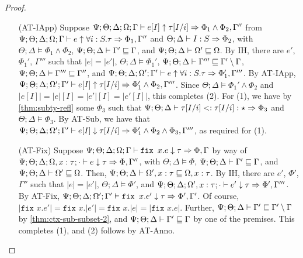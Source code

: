 \begin{proof}
\begin{itemize}
  \item[(AT-IApp)] Suppose $\Psi ; \Theta ; \Delta ; \Omega ; \Gamma \vdash e [I] \uparrow \tau[I/i] \Rightarrow \Phi_1 \wedge \Phi_2,\Gamma''$
  from $\Psi ; \Theta ; \Delta ; \Omega ; \Gamma \vdash e \uparrow \forall i : S.\tau \Rightarrow \Phi_1,\Gamma''$ and
  $\Theta ; \Delta \vdash I : S \Rightarrow \Phi_2$, with
  $\Theta ; \Delta \vDash \Phi_1 \wedge \Phi_2$,
  $\Psi ; \Theta ; \Delta \vdash \Gamma' \sqsubseteq \Gamma$, and
  $\Psi ; \Theta ; \Delta \vdash \Omega' \sqsubseteq \Omega$.
  By IH, there are $e'$, $\Phi_1'$, $\Gamma'''$ such that
  $|e| = |e'|$,
  $\Theta ; \Delta \vDash \Phi_1'$,
  $\Psi ; \Theta ; \Delta \vdash \Gamma''' \sqsubseteq \Gamma' \setminus \Gamma$,
  $\Psi ; \Theta ; \Delta \vdash \Gamma''' \sqsubseteq \Gamma''$, and
  $\Psi ; \Theta ; \Delta ; \Omega' ; \Gamma' \vdash e \uparrow \forall i : S. \tau \Rightarrow \Phi_1',\Gamma'''$.
  By AT-IApp,
  $\Psi ; \Theta ; \Delta ; \Omega' ; \Gamma' \vdash e [I] \uparrow \tau[I/i] \Rightarrow \Phi_1' \wedge \Phi_2,\Gamma'''$.
  Since $\Theta ; \Delta \vDash \Phi_1' \wedge \Phi_2$ and $|e[I]| = |e|[I] = |e'|[I] = |e'[I]|$, this completes (2).
  For (1), we have by \autoref{thm:subty-refl} some $\Phi_3$ such that $\Psi ; \Theta ; \Delta \vdash \tau[I/i] <: \tau[I/i] : \star \Rightarrow \Phi_3$
  and $\Theta ; \Delta \vDash \Phi_3$.
  By AT-Sub, we  have that $\Psi ; \Theta ; \Delta ; \Omega' ; \Gamma' \vdash e [I] \downarrow \tau[I/i] \Rightarrow \Phi_1' \wedge \Phi_2 \wedge \Phi_3,\Gamma'''$,
  as required for (1).
  
  \item[(AT-Fix)] Suppose $\Psi ; \Theta ; \Delta ; \Omega ; \Gamma \vdash \texttt{fix } x.e \downarrow \tau \Rightarrow \Phi,\Gamma$
  by way of $\Psi ; \Theta ; \Delta ; \Omega, x : \tau ; \cdot \vdash e \downarrow \tau \Rightarrow \Phi,\Gamma''$, with
  $\Theta ; \Delta \vDash \Phi$,
  $\Psi ; \Theta ; \Delta \vdash \Gamma' \sqsubseteq \Gamma$, and
  $\Psi ; \Theta ; \Delta \vdash \Omega' \sqsubseteq \Omega$. Then,
  $\Psi ; \Theta ; \Delta \vdash \Omega', x : \tau \sqsubseteq \Omega, x : \tau$.
  By IH, there are $e'$, $\Phi'$, $\Gamma''$ such that
  $|e| = |e'|$,
  $\Theta ; \Delta \vDash \Phi'$, and
  $\Psi ; \Theta ; \Delta ; \Omega', x : \tau ; \cdot \vdash e' \downarrow \tau \Rightarrow \Phi',\Gamma'''$.
  By AT-Fix,
  $\Psi ; \Theta ; \Delta ; \Omega' ; \Gamma' \vdash \texttt{fix } x.e' \downarrow \tau \Rightarrow \Phi',\Gamma'$.
  Of course, $|\texttt{fix }x.e'| = \texttt{fix }x.|e'| = \texttt{fix }x.|e| = |\texttt{fix }x.e|$.
  Further, $\Psi ; \Theta ; \Delta \vdash \Gamma' \sqsubseteq \Gamma' \setminus \Gamma$
  by \autoref{thm:ctx-sub-subset-2}, and $\Psi ; \Theta ; \Delta \vdash \Gamma' \sqsubseteq \Gamma$ by one of the premises.
  This completes (1), and (2) follows by AT-Anno.
  

\end{itemize}
\end{proof}
